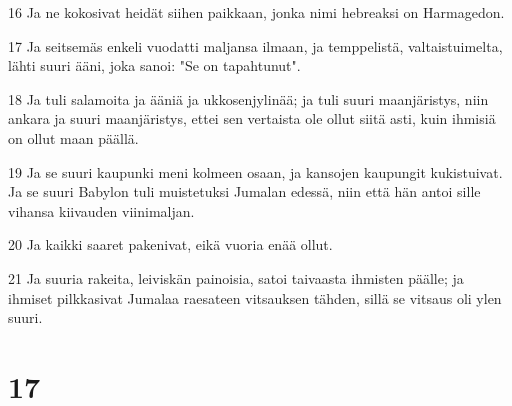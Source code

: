 \par 16 Ja ne kokosivat heidät siihen paikkaan, jonka nimi hebreaksi on Harmagedon.
\par 17 Ja seitsemäs enkeli vuodatti maljansa ilmaan, ja temppelistä, valtaistuimelta, lähti suuri ääni, joka sanoi: "Se on tapahtunut".
\par 18 Ja tuli salamoita ja ääniä ja ukkosenjylinää; ja tuli suuri maanjäristys, niin ankara ja suuri maanjäristys, ettei sen vertaista ole ollut siitä asti, kuin ihmisiä on ollut maan päällä.
\par 19 Ja se suuri kaupunki meni kolmeen osaan, ja kansojen kaupungit kukistuivat. Ja se suuri Babylon tuli muistetuksi Jumalan edessä, niin että hän antoi sille vihansa kiivauden viinimaljan.
\par 20 Ja kaikki saaret pakenivat, eikä vuoria enää ollut.
\par 21 Ja suuria rakeita, leiviskän painoisia, satoi taivaasta ihmisten päälle; ja ihmiset pilkkasivat Jumalaa raesateen vitsauksen tähden, sillä se vitsaus oli ylen suuri.

\chapter{17}

